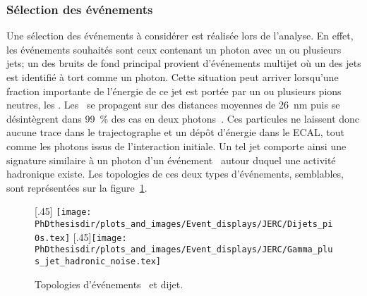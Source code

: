 \subsubsection{Sélection des événements}
Une sélection des événements à considérer est réalisée lors de l'analyse.
En effet, les événements souhaités sont ceux contenant un photon avec un ou plusieurs jets;
un des bruits de fond principal provient d'événements multijet où un des jets est identifié à tort comme un photon.
Cette situation peut arriver lorsqu'une fraction importante de l'énergie de ce jet est portée par un ou plusieurs pions neutres, les \pionnull.
Les \pionnull\ se propagent sur des distances moyennes de \SI{26}{\nano\meter} puis se désintègrent dans \SI{99}{\%} des cas en deux photons~\cite{PDG_booklet_2020}.
Ces particules ne laissent donc aucune trace dans le trajectographe et un dépôt d'énergie dans le ECAL, tout comme les photons issus de l'interaction initiale.
Un tel jet comporte ainsi une signature similaire à un photon d'un événement \Gjet\ autour duquel une activité hadronique existe.
Les topologies de ces deux types d'événements, semblables, sont représentées sur la figure~\ref{fig-Gamma_plus_jet_events_real_faked}.
\begin{figure}[h]
\centering
{}[.45\textwidth]
{\texttt{[image: \\PhDthesisdir/plots\_and\_images/Event\_displays/JERC/Dijets\_pi0s.tex]}}
\hfill
{}[.45\textwidth]{\texttt{[image: \\PhDthesisdir/plots\_and\_images/Event\_displays/JERC/Gamma\_plus\_jet\_hadronic\_noise.tex]}}
\caption{Topologies d'événements \Gjet\ et dijet.}
\label{fig-Gamma_plus_jet_events_real_faked}
\end{figure}
